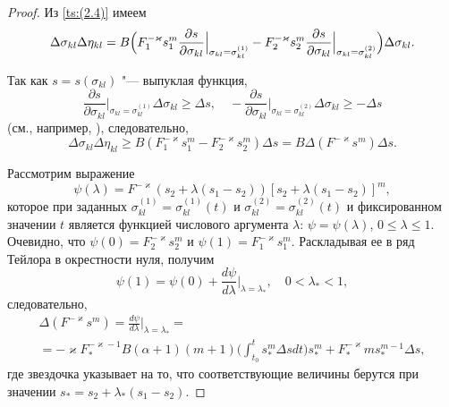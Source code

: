 \begin{proof}
Из \eqref{ts:(2.4)} имеем
$$
\Delta\sigma_{kl}\Delta\eta_{kl}=B\Bigl(F_{1}^{-\varkappa}s_{1}^{m} \frac{\partial s}{\partial\sigma_{kl}}\Bigr|_{\sigma_{kl}=\sigma_{kl}^{(1)}}-F_{2}^{-\varkappa}s_{2}^{m} \frac{\partial s}{\partial\sigma_{kl}}\Bigr|_{\sigma_{kl}=\sigma_{kl}^{(2)}}\Bigr)\Delta\sigma_{kl}.
$$



Так как $s=s(\sigma_{kl})$ "--- выпуклая функция, 
$$
\frac{\partial s}{\partial \sigma_{kl}}\Bigr|_{\sigma_{kl}=\sigma_{kl}^{(1)}}\Delta\sigma_{kl}\geq\Delta s,\quad  
-\frac{\partial s}{\partial\sigma_{kl}}\Bigr|_{\sigma_{kl}=\sigma_{kl}^{(2)}}\Delta\sigma_{kl}\geq-\Delta s $$
(см., например, \cite{ts:Goldenblat}), следовательно,
\begin{equation}
\Delta\sigma_{kl}\Delta\eta_{kl}\geq B\left(F_{1}^{-\varkappa}s_{1}^{m}-F_{2}^{-\varkappa}s_{2}^{m}\right)\Delta s=B\Delta\left(F^{-\varkappa}s^{m}\right)\Delta s.
\label{ts:(2.5)}
\end{equation}


Рассмотрим выражение 
$$
\psi(\lambda)=F^{-\varkappa}(s_{2}+ \lambda(s_{1}-s_{2}))\left[s_{2}+\lambda(s_{1}-s_{2})\right]^{m},
$$ 
которое при заданных $\sigma_{kl}^{(1)}=\sigma_{kl}^{(1)}(t)$ и $\sigma_{kl}^{(2)}=\sigma_{kl}^{(2)}(t)$ и фиксированном значении $t$ является функцией числового аргумента $\lambda$: $\psi=\psi(\lambda)$, $0\leq\lambda\leq1$. 
Очевидно, что $\psi(0)=F_{2}^{-\varkappa}s_{2}^{m}$ и  $\psi(1)=F_{1}^{-\varkappa}s_{1}^{m}$. 
Раскладывая ее в ряд Тейлора в окрестности нуля, получим 
$$
\psi(1)=\psi(0)+\frac{d\psi}{d\lambda}\Bigr|_{\lambda=\lambda_{*}},\quad  0<\lambda_{*}<1,
$$ следовательно,
\begin{multline}
\Delta\left(F^{-\varkappa}s^{m}\right)=  \frac{d\psi}{d\lambda}\Bigr|_{\lambda=\lambda_{*}}= 
\\
=-\varkappa F_{*}^{-\varkappa-1}B(\alpha+1)(m+1)\biggl(\int_{t_{0}}^{t}s_{*}^{m}\Delta sdt\biggr) s_{*}^{m}+F_{*}^{-\varkappa}ms_{*}^{m-1}\Delta s,
\label{ts:my2}
\end{multline}
где звездочка указывает на то, что соответствующие величины берутся при значении $s_{*}=s_{2}+\lambda_{*}(s_{1}-s_{2})$.


\end{proof}
